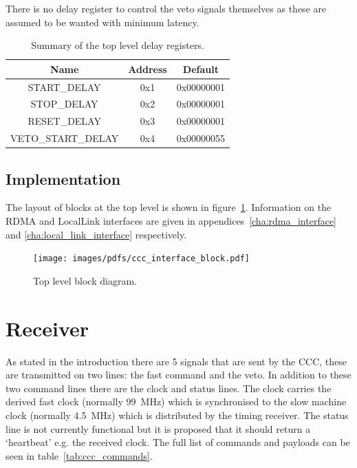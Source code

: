\documentclass[]{report}
\begin{document}
    There is no delay register to control the veto signals themselves as these are assumed to be wanted with minimum latency.
    
    \begin{table}
        \begin{center}
            \begin{tabular}{c | c | c }
                Name               & Address & Default    \\
                \hline
                START\_DELAY       & 0x1     & 0x00000001 \\
                STOP\_DELAY        & 0x2     & 0x00000001 \\
                RESET\_DELAY       & 0x3     & 0x00000001 \\
                VETO\_START\_DELAY & 0x4     & 0x00000055 \\
            \end{tabular}
        \end{center}
        \caption{Summary of the top level delay registers.}
        \label{tab:delay_regs}
    \end{table}
    \section{Implementation} %
    \label{sub:top_implementation}
    The layout of blocks at the top level is shown in figure~\ref{fig:ccc_interface_block}. Information on the RDMA and LocalLink interfaces are given in appendices~\ref{cha:rdma_interface} and \ref{cha:local_link_interface} respectively.
    
    \begin{figure}[htbp]
        \centering
            \texttt{[image: images/pdfs/ccc\_interface\_block.pdf]}
        \caption{Top level block diagram.}
        \label{fig:ccc_interface_block}
    \end{figure}
    
    \chapter{Receiver} %
    \label{cha:receiver}
    As stated in the introduction there are 5 signals that are sent by the CCC, these are transmitted on two lines: the fast command and the veto. In addition to these two command lines there are the clock and status lines. The clock carries the derived fast clock (normally 99~MHz) which is synchronised to the slow machine clock (normally 4.5~MHz) which is distributed by the timing receiver. The status line is not currently functional but it is proposed that it should return a `heartbeat' e.g. the received clock. The full list of commands and payloads can be seen in table~\ref{tab:ccc_commands}.
  
\end{document}

